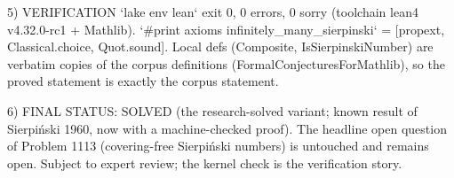 5) VERIFICATION
`lake env lean` exit 0, 0 errors, 0 sorry (toolchain lean4 v4.32.0-rc1 + Mathlib).
`#print axioms infinitely_many_sierpinski` = [propext, Classical.choice, Quot.sound].
Local defs (Composite, IsSierpinskiNumber) are verbatim copies of the corpus definitions
(FormalConjecturesForMathlib), so the proved statement is exactly the corpus statement.

6) FINAL STATUS: SOLVED (the research-solved variant; known result of Sierpiński 1960,
now with a machine-checked proof). The headline open question of Problem 1113
(covering-free Sierpiński numbers) is untouched and remains open. Subject to expert review;
the kernel check is the verification story.
